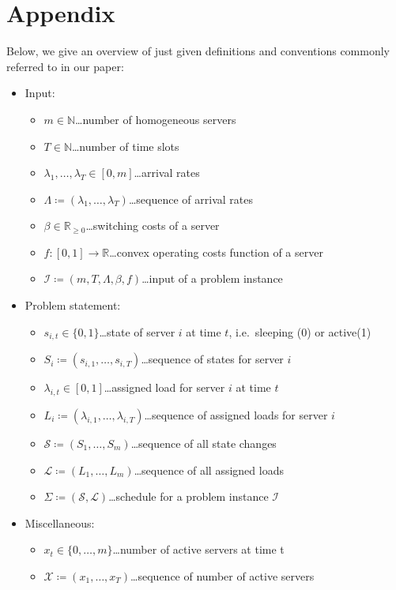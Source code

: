 \documentclass[hidelinks]{article}
\theoremstyle{plain}
\theoremstyle{definition}
\theoremstyle{rem}
\newcommand{\mx}{\mathcal{X}}
\newcommand{\inp}{\mathcal{I}}
\newcommand{\fromto}[2]{\{#1,\ldots,#2\}}
\begin{document}
\section*{Appendix}
Below, we give an overview of just given definitions and conventions commonly referred to in our paper:
\begin{itemize}
\item Input:
\begin{itemize}
	\item $m\in\mathbb{N}$\ldots number of homogeneous servers
	\item $T\in\mathbb{N}$\ldots number of time slots
	\item $\lambda_1,\ldots,\lambda_{T}\in[0,m]$\ldots arrival rates
	\item $\Lambda\coloneqq(\lambda_1,\ldots,\lambda_T)$\ldots sequence of arrival rates
	\item $\beta\in\mathbb{R}_{\ge 0}$\ldots switching costs of a server
	\item $f:[0,1]\rightarrow\mathbb{R}$\ldots convex operating costs function of a server
	\item $\inp\coloneqq(m,T,\Lambda,\beta,f)$\ldots input of a problem instance
\end{itemize}

\item Problem statement:
\begin{itemize}
	\item $s_{i,t}\in\{0,1\}$\ldots state of server $i$ at time $t$, i.e.\ sleeping (0) or active(1)
	\item $S_i\coloneqq(s_{i,1},\ldots,s_{i,T})$\ldots sequence of states for server $i$
	\item $\lambda_{i,t}\in[0,1]$\ldots assigned load for server $i$ at time $t$
	\item $L_i\coloneqq(\lambda_{i,1},\ldots,\lambda_{i,T})$\ldots sequence of assigned loads for server $i$
	\item $\mathcal{S}\coloneqq(S_1,\ldots,S_m)$\ldots sequence of all state changes
	\item $\mathcal{L}\coloneqq(L_1,\ldots,L_m)$\ldots sequence of all assigned loads
	\item $\Sigma\coloneqq(\mathcal{S},\mathcal{L})$\ldots schedule for a problem instance $\inp$
\end{itemize}

\item Miscellaneous:
\begin{itemize}
	\item $x_t\in\fromto{0}{m}$\ldots number of active servers at time t
	\item $\mx\coloneqq(x_1,\ldots,x_T)$\ldots sequence of number of active servers
\end{itemize}


\end{itemize}
\end{document}
